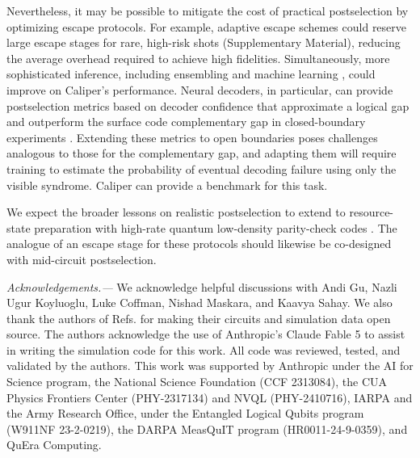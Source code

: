 \documentclass[
    reprint,
    amsmath,amssymb,
    nofootinbib,
    superscriptaddress,
    aps,
    noeprint,
    longbibliography,
    prl
]{revtex4-2}
\theoremstyle{plain}
\begin{document}
Nevertheless, it may be possible to mitigate the cost of practical postselection by optimizing escape protocols. For example, adaptive escape schemes \cite{mishima2026adaptive} could reserve large escape stages for rare, high-risk shots (Supplementary Material), reducing the average overhead required to achieve high fidelities. Simultaneously, more sophisticated inference, including ensembling \cite{shutty_efficient_2026} and machine
learning \cite{gu_scalable_2026, bonilla_ataides_neural_2026, dentelski2026neural, blue_machine_2026,
baireuther_machine-learning-assisted_2017, baireuther_neural_2019, lacroix_scaling_2025,
bausch_learning_2024, meinerz_scalable_2022, bluvstein_fault-tolerant_2026,lange_data-driven_2025,
cao_generative_2025, liu_decoding_2025, hu2025efficient, zhang2025learning}, could improve on Caliper's performance.
Neural decoders, in particular, can provide postselection metrics based on decoder confidence that
approximate a logical gap and outperform the surface code complementary gap in closed-boundary
experiments \cite{gu_scalable_2026, dentelski2026neural, bausch_learning_2024}. Extending these metrics to open boundaries
poses challenges analogous to those for the complementary gap, and adapting them will require training
to estimate the probability of eventual decoding failure using only the visible syndrome. Caliper
can provide a benchmark for this task.

We expect the broader lessons on realistic postselection to extend to resource-state
preparation with high-rate quantum low-density parity-check codes \cite{menon_magic_2025, jacob_single-shot_2025, li_transversal_2025, hetenyi2026constantdepthmagicstate}. The analogue of an
escape stage for these protocols should likewise be co-designed with mid-circuit postselection.

\let\oldaddcontentsline\addcontentsline
\renewcommand{\addcontentsline}[3]{}
\begin{acknowledgments}
    \textit{Acknowledgements.---} We acknowledge helpful discussions with Andi Gu, Nazli Ugur
    Koyluoglu, Luke Coffman, Nishad Maskara, and Kaavya Sahay. We also thank the authors of Refs.
    \cite{gidney_magic_2024, sahay2026fold} for making their circuits and simulation data open
    source. The authors acknowledge the use of Anthropic's Claude Fable 5 to assist in writing the
    simulation code for this work. All code was reviewed, tested, and validated by the authors. 
    This work was supported by Anthropic under the AI for Science program, the National Science
    Foundation (CCF 2313084), the CUA Physics Frontiers Center (PHY-2317134) and NVQL (PHY-2410716),
    IARPA and the Army Research Office, under the Entangled Logical Qubits program (W911NF
    23-2-0219), the DARPA MeasQuIT program (HR0011-24-9-0359), and QuEra Computing.
\end{acknowledgments}
\end{document}
